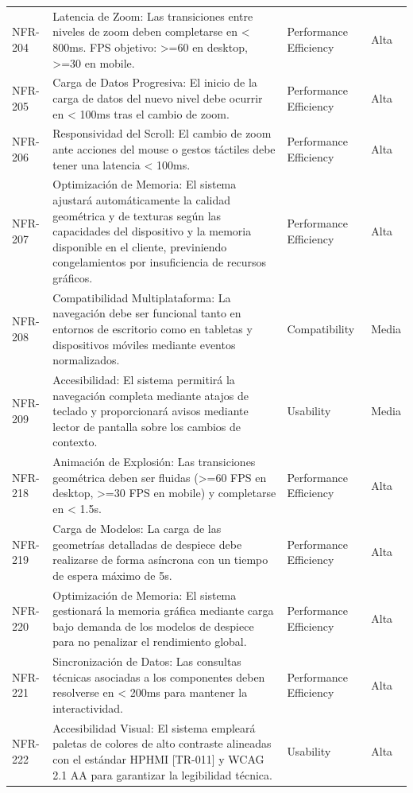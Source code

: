 \begin{longtable}{>{\raggedright\arraybackslash}p{} >{\raggedright\arraybackslash}p{} >{\raggedright\arraybackslash}p{} >{\raggedright\arraybackslash}p{}}
NFR-204 & Latencia de Zoom: Las transiciones entre niveles de zoom deben completarse en < 800ms. FPS objetivo: >=60 en desktop, >=30 en mobile. & Performance Efficiency & Alta \\
NFR-205 & Carga de Datos Progresiva: El inicio de la carga de datos del nuevo nivel debe ocurrir en < 100ms tras el cambio de zoom. & Performance Efficiency & Alta \\
NFR-206 & Responsividad del Scroll: El cambio de zoom ante acciones del mouse o gestos táctiles debe tener una latencia < 100ms. & Performance Efficiency & Alta \\
NFR-207 & Optimización de Memoria: El sistema ajustará automáticamente la calidad geométrica y de texturas según las capacidades del dispositivo y la memoria disponible en el cliente, previniendo congelamientos por insuficiencia de recursos gráficos. & Performance Efficiency & Alta \\
NFR-208 & Compatibilidad Multiplataforma: La navegación debe ser funcional tanto en entornos de escritorio como en tabletas y dispositivos móviles mediante eventos normalizados. & Compatibility & Media \\
NFR-209 & Accesibilidad: El sistema permitirá la navegación completa mediante atajos de teclado y proporcionará avisos mediante lector de pantalla sobre los cambios de contexto. & Usability & Media \\
NFR-218 & Animación de Explosión: Las transiciones geométrica deben ser fluidas (>=60 FPS en desktop, >=30 FPS en mobile) y completarse en < 1.5s. & Performance Efficiency & Alta \\
NFR-219 & Carga de Modelos: La carga de las geometrías detalladas de despiece debe realizarse de forma asíncrona con un tiempo de espera máximo de 5s. & Performance Efficiency & Alta \\
NFR-220 & Optimización de Memoria: El sistema gestionará la memoria gráfica mediante carga bajo demanda de los modelos de despiece para no penalizar el rendimiento global. & Performance Efficiency & Alta \\
NFR-221 & Sincronización de Datos: Las consultas técnicas asociadas a los componentes deben resolverse en < 200ms para mantener la interactividad. & Performance Efficiency & Alta \\
NFR-222 & Accesibilidad Visual: El sistema empleará paletas de colores de alto contraste alineadas con el estándar HPHMI [TR-011] y WCAG 2.1 AA para garantizar la legibilidad técnica. & Usability & Alta \\

\end{longtable}
